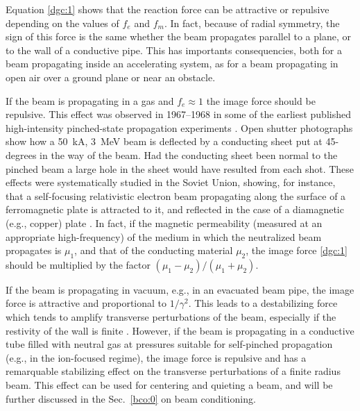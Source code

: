 \documentclass [12pt,a4paper,     ]{report} %
\begin{document}
   Equation \eqref{dgc:1} shows that the reaction force can be attractive or repulsive depending on the values of $f_e$ and $f_m$.  In fact, because of radial symmetry, the sign of this force is the same whether the beam propagates parallel to a plane, or to the wall of a conductive pipe. This has importants consequencies, both for a beam propagating inside an accelerating system, as for a beam propagating in open air over a ground plane or near an obstacle.

   If the beam is propagating in a gas and $f_e \approx 1$ the image force should be repulsive. This effect was observed in 1967--1968 in some of the earliest published high-intensity pinched-state propagation experiments \cite{LINK-1968-}.  Open shutter photographs show how a 50~kA, 3~MeV beam is deflected by a conducting sheet put at 45-degrees in the way of the beam.  Had the conducting sheet been normal to the pinched beam a large hole in the sheet would have resulted from each shot.  These effects were systematically studied in the Soviet Union, showing, for instance, that a self-focusing relativistic electron beam propagating along the surface of a ferromagnetic plate is attracted to it, and reflected in the case of a diamagnetic (e.g., copper)  plate \cite{DIDEN1976B}. In fact, if the magnetic permeability (measured at an appropriate high-frequency) of the medium in which the neutralized beam propagates is $\mu_1$, and that of the conducting material $\mu_2$, the image force \eqref{dgc:1} should be multiplied by the factor $(\mu_1 -\mu_2)/(\mu_1 +\mu_2)$.

   If the beam is propagating in vacuum, e.g., in an evacuated beam pipe, the image force is attractive and proportional to $1/\gamma^2$.  This leads to a destabilizing force which tends to amplify transverse perturbations of the beam, especially if the restivity of the wall is finite \cite{CAPOR1980-}. However, if the beam is propagating in a conductive tube filled with neutral gas at pressures suitable for self-pinched propagation (e.g., in the ion-focused regime), the image force is repulsive and has a remarquable stabilizing effect on the transverse perturbations of a finite radius beam.  This effect can be used for centering and quieting a beam, and will be further discussed in the Sec.~\ref{bco:0} on beam conditioning.
\end{document}

